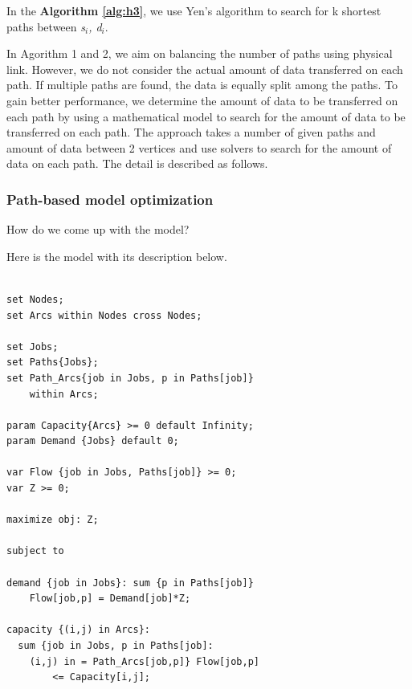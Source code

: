 In the \textbf{Algorithm \ref{alg:h3}}, we use Yen's algorithm to search for k shortest paths between \textit{s$_i$, d$_i$}.

In Agorithm 1 and 2, we aim on balancing the number of paths using physical link. However, we do not consider the actual amount of data transferred on each path. If multiple paths are found, the data is equally split among the paths. To gain better performance, we determine the amount of data to be transferred on each path by using a mathematical model to search for the amount of data to be transferred on each path. The approach takes a number of given paths and amount of data between 2 vertices and use solvers to search for the amount of data on each path. The detail is described as follows.

\subsubsection{Path-based model optimization}

How do we come up with the model?

Here is the model with its description below.

\begingroup
\fontsize{9pt}{9pt}\selectfont

\begin{verbatim}

set Nodes;
set Arcs within Nodes cross Nodes;

set Jobs;
set Paths{Jobs};
set Path_Arcs{job in Jobs, p in Paths[job]} 
    within Arcs;

param Capacity{Arcs} >= 0 default Infinity;
param Demand {Jobs} default 0;

var Flow {job in Jobs, Paths[job]} >= 0;
var Z >= 0;

maximize obj: Z;

subject to

demand {job in Jobs}: sum {p in Paths[job]} 
	Flow[job,p] = Demand[job]*Z;

capacity {(i,j) in Arcs}:
  sum {job in Jobs, p in Paths[job]: 
    (i,j) in = Path_Arcs[job,p]} Flow[job,p] 
		<= Capacity[i,j];

\end{verbatim}

\endgroup

